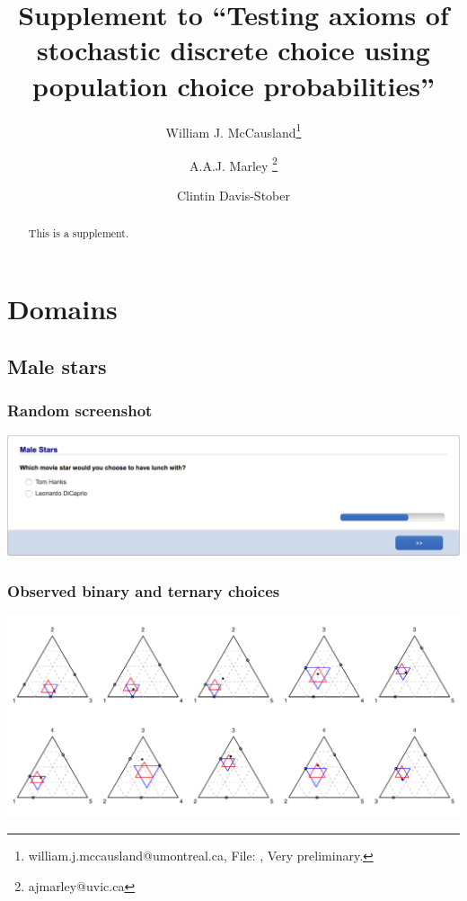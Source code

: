 \documentclass[11pt,letter]{article}
\title{Supplement to ``Testing axioms of stochastic discrete choice using population choice probabilities''}
\author[1]{William J. McCausland\thanks{william.j.mccausland@umontreal.ca, File: \texttt{\currfilename}, Very preliminary.}}
\author[2]{A.A.J. Marley \thanks{ajmarley@uvic.ca}}
\author[3]{Clintin Davis-Stober}
\affil[1]{Universit\'e de Montr\'eal}
\affil[2]{University of Victoria}
\affil[3]{University of Missouri}
\begin{document}
\maketitle

\begin{abstract}
	This is a supplement.
\end{abstract}

\section{Domains}\label{s:domains}

\pagebreak

\subsection*{Male stars}



\subsubsection*{Random screenshot}

\includegraphics[width=15cm]{Population_study_design/screenshot_Male_Stars.png}

\subsubsection*{Observed binary and ternary choices}

\includegraphics[width=15cm]{./Population_study_data/Simplexes/Male_stars.pdf}
\end{document}
